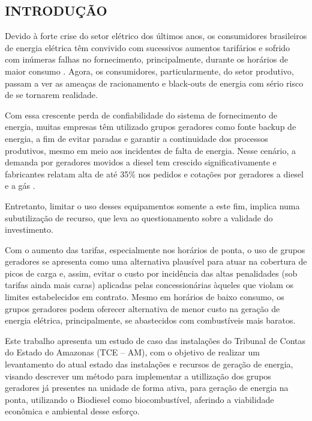 \newpage
\setcounter{page}{12}
\begin{center}
\section{INTRODUÇÃO}
\end{center}
\par

	\hspace{0.8cm}Devido à forte crise do setor elétrico dos últimos anos, os consumidores brasileiros de energia elétrica têm convivido com sucessivos aumentos tarifários e sofrido com inúmeras falhas no fornecimento, principalmente, durante os horários de maior consumo \cite{kurek}. Agora, os consumidores, particularmente, do setor produtivo, passam a ver as ameaças de racionamento e black-outs de energia com sério risco de se tornarem realidade. 
    
    Com essa crescente perda de confiabilidade do sistema de fornecimento de energia, muitas empresas têm utilizado grupos geradores como fonte backup de energia, a fim de evitar paradas e garantir a continuidade dos processos produtivos, mesmo em meio aos incidentes de falta de energia. Nesse cenário, a demanda por geradores movidos a diesel tem crescido significativamente e fabricantes relatam alta de até 35\% nos pedidos e cotações por geradores a diesel e a gás \cite{fucuchima}.
    
    Entretanto, limitar o uso desses equipamentos somente a este fim, implica numa subutilização de recurso, que leva ao questionamento sobre a validade do investimento. 
   
    Com o aumento das tarifas, especialmente nos horários de ponta, o uso de grupos geradores se apresenta como uma alternativa plausível para atuar na cobertura de picos de carga e, assim, evitar o custo por incidência das altas penalidades (sob tarifas ainda mais caras) aplicadas pelas concessionárias àqueles que violam os limites estabelecidos em contrato. Mesmo em horários de baixo consumo, os grupos geradores podem oferecer alternativa de menor custo na geração de energia elétrica, principalmente, se abastecidos com combustíveis mais baratos.
    
    Este trabalho apresenta um estudo de caso das instalações do Tribunal de Contas do Estado do Amazonas (TCE -- AM), com o objetivo de realizar um levantamento do atual estado das instalações e recursos de geração de energia, visando descrever um método para implementar a utillização dos grupos geradores já presentes na unidade de forma ativa, para geração de energia na ponta, utilizando o Biodiesel como biocombustível, aferindo a viabilidade econômica e ambiental desse esforço.
    
